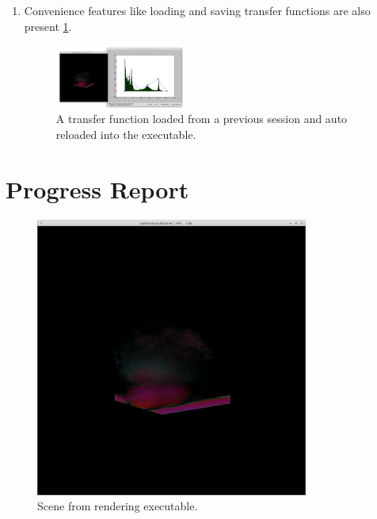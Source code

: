 \documentclass[letterpaper,11pt]{report}
\begin{document}
\begin{enumerate}
      \item
    Convenience features like loading and saving transfer functions are also present \ref{fig:working7}.

    \begin{figure}[h!]
     \centering
      \includegraphics[width=0.4\textwidth]{working7.png}
      \caption{A transfer function loaded from a previous session and auto reloaded into the executable.}
      \label{fig:working7}
     \end{figure}

\end{enumerate}

\section{Progress Report}

    \begin{figure}[h!]
     \centering
      \includegraphics[width=0.8\textwidth]{working8.png}
      \caption{Scene from rendering executable.}
      \label{fig:working8}
     \end{figure}
\end{document}
